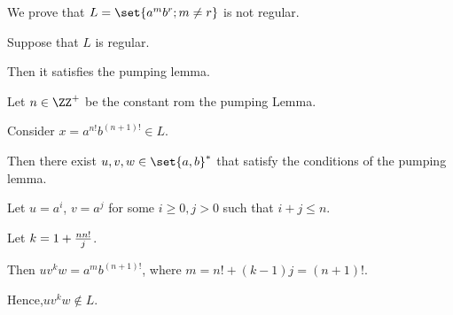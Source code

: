 \documentclass[11pt]{scrartcl}
\begin{document}
\begin{example}

  We prove that $L= \set{a^mb^r; m\neq r}$ is not regular.

  Suppose that $L$ is regular.

  Then it satisfies the pumping lemma.

  Let $n\in \ZZ^{+}$ be the constant rom the pumping Lemma.

  Consider $x = a^{n!}b^{(n+1)!}\in L$.

  Then there exist $u, v, w\in \set{a, b}^{*}$ that satisfy the
  conditions of the pumping lemma.

  Let $u= a^i$, $v = a^j$ for some $i \geq 0, j > 0$ such that
  $i+j \leq n$.

  Let $k = 1+\frac{n\*n!}{j}$.

  Then $uv^kw = a^mb^{(n+1)!}$, where $m = n!+(k-1)j = (n+1)!$.

  Hence,$uv^kw\not \in L$.

\end{example}
\end{document}
